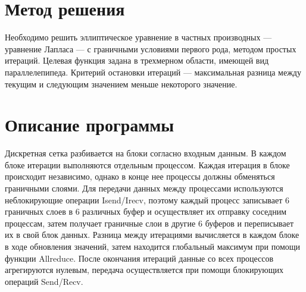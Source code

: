 \section{Метод решения}
Необходимо решить эллиптическое уравнение в частных производных --- уравнение Лапласа --- с граничными условиями первого рода, методом простых итераций. Целевая функция задана в трехмерном области, имеющей вид параллелепипеда. Критерий остановки итераций --- максимальная разница между текущим и следующим значением меньше некоторого значение.

\section{Описание программы}
Дискретная сетка разбивается на блоки согласно входным данным. В каждом блоке итерации выполняются отдельным процессом. Каждая итерация в блоке происходит независимо, однако в конце нее процессы должны обменяться граничными слоями. Для передачи данных между процессами используются неблокирующие операции Isend/Irecv, поэтому каждый процесс записывает 6 граничных слоев в 6 различных буфер и осуществляет их отправку соседним процессам, затем получает граничные слои в другие 6 буферов и переписывает их в свой блок данных. Разница между итерациями вычисляется в каждом блоке в ходе обновления значений, затем находится глобальный максимум при помощи функции Allreduce. После окончания итераций данные со всех процессов агрегируются нулевым, передача осуществляется при помощи блокирующих операций Send/Recv.